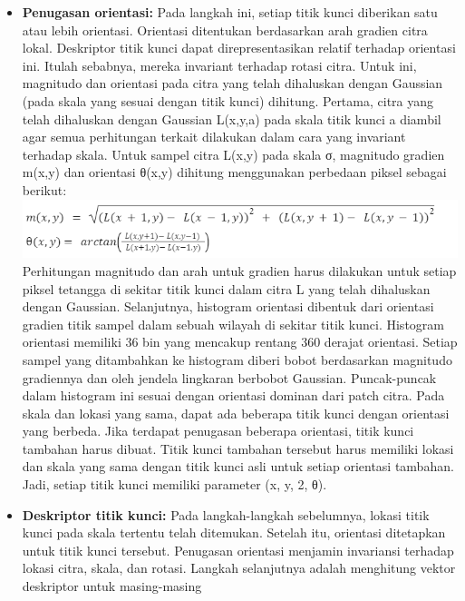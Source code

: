 \documentclass[
  letterpaper,
  DIV=11,
  numbers=noendperiod]{scrreprt}
\begin{document}
\begin{itemize}
\item
  \textbf{Penugasan orientasi:} Pada langkah ini, setiap titik kunci
  diberikan satu atau lebih orientasi. Orientasi ditentukan berdasarkan
  arah gradien citra lokal. Deskriptor titik kunci dapat
  direpresentasikan relatif terhadap orientasi ini. Itulah sebabnya,
  mereka invariant terhadap rotasi citra. Untuk ini, magnitudo dan
  orientasi pada citra yang telah dihaluskan dengan Gaussian (pada skala
  yang sesuai dengan titik kunci) dihitung. Pertama, citra yang telah
  dihaluskan dengan Gaussian L(x,y,a) pada skala titik kunci a diambil
  agar semua perhitungan terkait dilakukan dalam cara yang invariant
  terhadap skala. Untuk sampel citra L(x,y) pada skala σ, magnitudo
  gradien m(x,y) dan orientasi θ(x,y) dihitung menggunakan perbedaan
  piksel sebagai berikut:\\
  \includegraphics{Asset/image114.png}\\
  Perhitungan magnitudo dan arah untuk gradien harus dilakukan untuk
  setiap piksel tetangga di sekitar titik kunci dalam citra L yang telah
  dihaluskan dengan Gaussian. Selanjutnya, histogram orientasi dibentuk
  dari orientasi gradien titik sampel dalam sebuah wilayah di sekitar
  titik kunci. Histogram orientasi memiliki 36 bin yang mencakup rentang
  360 derajat orientasi. Setiap sampel yang ditambahkan ke histogram
  diberi bobot berdasarkan magnitudo gradiennya dan oleh jendela
  lingkaran berbobot Gaussian. Puncak-puncak dalam histogram ini sesuai
  dengan orientasi dominan dari patch citra. Pada skala dan lokasi yang
  sama, dapat ada beberapa titik kunci dengan orientasi yang berbeda.
  Jika terdapat penugasan beberapa orientasi, titik kunci tambahan harus
  dibuat. Titik kunci tambahan tersebut harus memiliki lokasi dan skala
  yang sama dengan titik kunci asli untuk setiap orientasi tambahan.
  Jadi, setiap titik kunci memiliki parameter (x, y, 2, θ).
\item
  \textbf{Deskriptor titik kunci:} Pada langkah-langkah sebelumnya,
  lokasi titik kunci pada skala tertentu telah ditemukan. Setelah itu,
  orientasi ditetapkan untuk titik kunci tersebut. Penugasan orientasi
  menjamin invariansi terhadap lokasi citra, skala, dan rotasi. Langkah
  selanjutnya adalah menghitung vektor deskriptor untuk masing-masing

\end{itemize}
\end{document}

